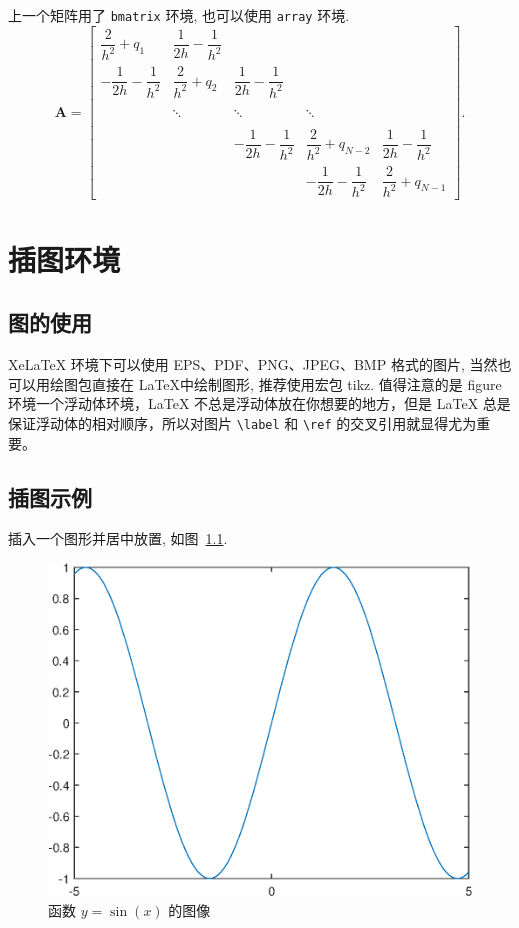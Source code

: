 \documentclass[UTF8,openany,twoside,12pt]{book}
\theoremstyle{plain}
\begin{document}
上一个矩阵用了 \verb|bmatrix| 环境, 也可以使用 \verb|array| 环境.
\begin{equation}\label{equ:matrix2}
\boldsymbol{A}=\left[\begin{array}{cccccc}
\dfrac{2}{h^{2}}+q_{1} & \dfrac{1}{2h}-\dfrac{1}{h^{2}} &   &  &  \\[8pt]
 -\dfrac{1}{2h}-\dfrac{1}{h^{2}} & \dfrac{2}{h^{2}}+q_{2} & \dfrac{1}{2h}-\dfrac{1}{h^{2}}  & &  \\[8pt]
  &  &  &  &    \\
   &  \ddots  & \ddots  &  \ddots  &  \\[8pt]
   &  &  &  &    \\
  &   & -\dfrac{1}{2h}-\dfrac{1}{h^{2}} & \dfrac{2}{h^{2}}+q_{N-2}& \dfrac{1}{2h}-\dfrac{1}{h^{2}} \\[8pt]
  &  &  & -\dfrac{1}{2h}-\dfrac{1}{h^{2}} & \dfrac{2}{h^{2}}+q_{N-1}
\end{array}\right].
\end{equation}




\chapter{插图环境}

\section{图的使用}

XeLaTeX 环境下可以使用 EPS、PDF、PNG、JPEG、BMP 格式的图片, 当然也可以用绘图包直接在 \LaTeX 中绘制图形, 推荐使用宏包 tikz. 值得注意的是 figure 环境一个浮动体环境，LaTeX 不总是浮动体放在你想要的地方，但是 LaTeX 总是保证浮动体的相对顺序，所以对图片 \verb|\label| 和 \verb|\ref| 的交叉引用就显得尤为重要。

\section{插图示例}

插入一个图形并居中放置, 如图~\ref{fig:sinx}.
\begin{figure}[htp!]
  \centering
  \includegraphics[width=0.45\linewidth]{image1.eps}
  \caption{函数 $y=\sin(x)$ 的图像}\label{fig:sinx}
\end{figure}
\end{document}
